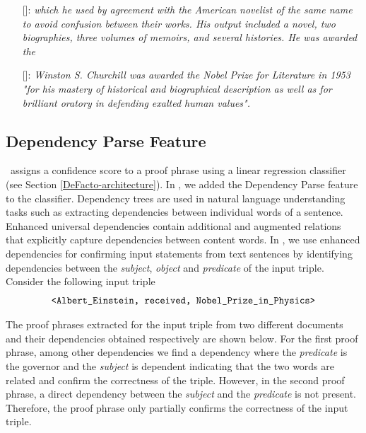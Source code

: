 \begin{itemize}
\item[] [\DeFacto]: \textit{which he used by agreement with the American novelist of the same name to avoid confusion between their works. His output included a novel, two biographies, three volumes of memoirs, and several histories. He was awarded the}\\

\item[] [\FactCheck]: \textit{Winston S. Churchill was awarded the Nobel Prize for Literature in 1953 "for his mastery of historical and biographical description as well as for brilliant oratory in defending exalted human values".}
\end{itemize}


\subsection{Dependency Parse Feature} \label{subsec:Dependency_feature}
\DeFacto\ assigns a confidence score to a proof phrase using a linear regression classifier (see Section \ref{DeFacto-architecture}). In \FactCheck, we added the Dependency Parse feature to the classifier. Dependency trees are used in natural language understanding tasks such as extracting dependencies between individual words of a sentence.  Enhanced universal dependencies \cite{schuster2016enhanced} contain additional and augmented relations that explicitly capture dependencies between content words. In \FactCheck, we use enhanced dependencies for confirming input statements from text sentences by identifying dependencies between the \textit{subject}, \textit{object} and \textit{predicate} of the input triple. Consider the following input triple
\begin{equation*}
\text{\texttt{<Albert\_Einstein, received, Nobel\_Prize\_in\_Physics>}}
\end{equation*}

The proof phrases extracted for the input triple from two different documents and their dependencies obtained respectively are shown below. For the first proof phrase, among other dependencies we find a dependency where the \textit{predicate} is the governor and the \textit{subject} is dependent indicating that the two words are related and confirm the correctness of the triple. However, in the second proof phrase, a direct dependency between the \textit{subject} and the \textit{predicate} is not present. Therefore, the proof phrase only partially confirms the correctness of the input triple.\\

